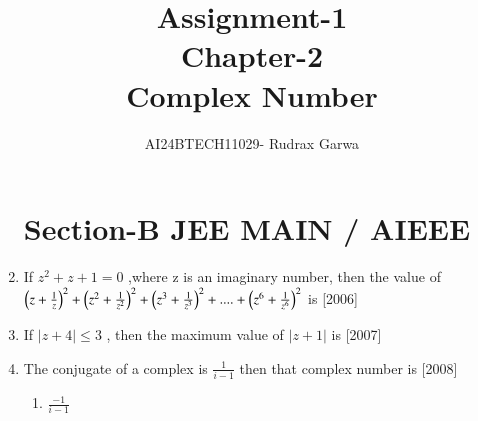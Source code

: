 \documentclass[journal,12pt,twocolumn,article]{IEEEtran}
\theoremstyle{remark}
\begin{document}
                                   
\begin{enumerate}[start = 14]                      

\vspace{3cm}                                       
\title{Assignment-1 \\Chapter-2\\Complex Number}
\author{AI24BTECH11029- Rudrax Garwa}              
\maketitle
\newpage                                           
\bigskip
\section*{Section-B   JEE MAIN / AIEEE}
\item If $z^2+z+1=0$ ,where z is an imaginary number, then the value of $\left(z+\frac{1}{z}\right)^2 + \left(z^2+\frac{1}{z^2}\right)^2 + \left(z^3 +\frac{1}{z^3}\right)^2 +....+\left(z^6 +\frac{1}{z^6}\right)^2$ is
\hfill{[2006]}
\begin{enumerate}
\end{enumerate}
\item If $|z+4|\leq 3$ , then the maximum value of $|z+1|$ is
\hfill{[2007]}                                     
\begin{enumerate}                                  
\end{enumerate}
\item The conjugate of a complex is $\frac{1}{i-1}$ then that complex number is
\hfill{[2008]}
\begin{multicols}{4}
\begin{enumerate}
\item $\frac{-1}{i-1}$

\end{enumerate}
\end{multicols}
\end{enumerate}
\end{document}
